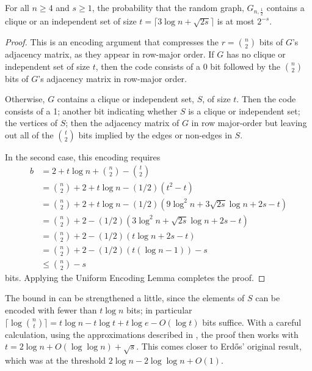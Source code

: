 \documentclass[lotsofwhite]{patmorin}
\begin{document}
\begin{thm}
  For all $n\ge 4$ and $s\ge 1$, the probability that the random graph,
  $G_{n,\frac{1}{2}}$ contains a clique or an independent set of size $t =
  \lceil 3\log n + \sqrt{2s}\rceil$ is at most $2^{-s}$.
\end{thm}

\begin{proof}
  This is an encoding argument that compresses the $r=\binom{n}{2}$ bits
  of $G$'s adjacency matrix, as they appear in row-major order.  If $G$
  has no clique or independent set of size $t$, then the code consists of
  a 0 bit followed by the $\binom{n}{2}$ bits of $G$'s adjacency matrix
  in row-major order.
  
  Otherwise, $G$ contains a clique or independent set, $S$, of size
  $t$.  Then the code consists of a 1; another bit indicating whether
  $S$ is a clique or independent set; the vertices of $S$; then the
  adjacency matrix of $G$ in row major-order but leaving out all of the
  $\binom{t}{2}$ bits implied by the edges or non-edges in $S$.
  
  In the second case, this encoding requires 
  \begin{align*}
     b & = 2 + t\log n + \binom{n}{2}-\binom{t}{2} \\
       & = \binom{n}{2} + 2 + t\log n - (1/2)(t^2 - t) \\
       & = \binom{n}{2} + 2 + t\log n 
            - (1/2)\left(9\log^2 n +3\sqrt{2s}\log n + 2s - t\right) \\
       & = \binom{n}{2} + 2 
            - (1/2)\left(3\log^2 n + \sqrt{2s}\log n + 2s - t\right) \\
       & = \binom{n}{2} + 2 
            - (1/2)\left(t\log n + 2s - t\right) \\
       & = \binom{n}{2} + 2 
            - (1/2)\left(t(\log n-1)\right) - s \\
       & \le \binom{n}{2} - s 
  \end{align*}
  bits.   Applying the Uniform Encoding
  Lemma completes the proof.
\end{proof}

\begin{rem}
The bound in  can be strengthened a little,
since the elements of $S$ can be encoded with fewer than $t\log n$
bits; in particular $\lceil\log\binom{n}{t}\rceil=t\log n - t\log t +
t\log e - O(\log t)$ bits suffice.  With a careful calculation, using
the approximations described in , the
proof then works with $t=2\log n +O(\log\log n) + \sqrt{s}$. This comes
closer to Erdős' original result, which was at the threshold $2\log n -
2\log\log n + O(1)$.
\end{rem}
\end{document}
